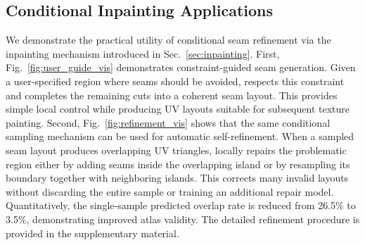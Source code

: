 \subsection{Conditional Inpainting Applications}
\label{sec:app_inpainting}
We demonstrate the practical utility of conditional seam refinement via the inpainting mechanism introduced in Sec.~\ref{sec:inpainting}.
First, Fig.~\ref{fig:user_guide_vis} demonstrates constraint-guided seam generation. 
Given a user-specified region where seams should be avoided, \methodname{} respects this constraint and completes the remaining cuts into a coherent seam layout. 
This provides simple local control while producing UV layouts suitable for subsequent texture painting.
Second, Fig.~\ref{fig:refinement_vis} shows that the same conditional sampling mechanism can be used for automatic self-refinement. 
When a sampled seam layout produces overlapping UV triangles, \methodname{} locally repairs the problematic region either by adding seams inside the overlapping island or by resampling its boundary together with neighboring islands. 
This corrects many invalid layouts without discarding the entire sample or training an additional repair model. 
Quantitatively, the single-sample predicted overlap rate is reduced from 26.5\% to 3.5\%, demonstrating improved atlas validity.
The detailed refinement procedure is provided in the supplementary material.



